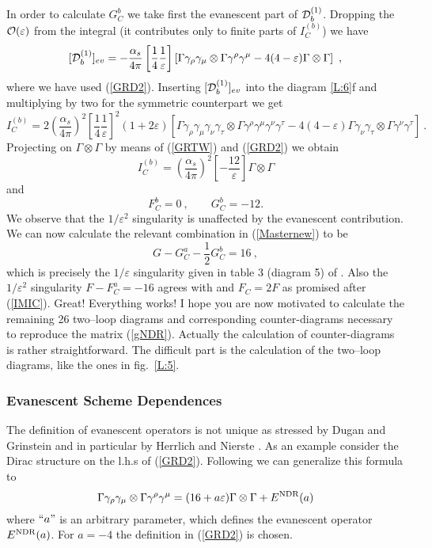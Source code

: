 \documentclass[12pt]{article}
\def\as{\alpha_s}
\newcommand{\be}{\begin{equation}}
\newcommand{\ee}{\end{equation}}
\newcommand{\ord}{{\cal O}}
\begin{document}
\begin{itemize}
\begin{itemize}
In order to calculate $G^b_C$ we take first the evanescent part
of ${\cal D}^{(1)}_b$. Dropping the $\ord(\varepsilon)$ from
the integral (it contributes only to finite parts of $I^{(b)}_C$) we have
\be\label{DS7}
[{\cal D}^{(1)}_b]_{ev}=-\frac{\as}{4\pi}
\left[\frac{1}{4}\frac{1}{\varepsilon}\right]
\left[\Gamma\gamma_\rho\gamma_\mu\otimes\Gamma\gamma^\rho\gamma^\mu
-4 (4-\varepsilon)\Gamma\otimes\Gamma\right]~,
\ee
where we have used (\ref{GRD2}). Inserting $[{\cal D}^{(1)}_b]_{ev}$
into the diagram \ref{L:6}f and multiplying by two for the symmetric
counterpart we get
\be\label{DS8}
I^{(b)}_C=2
\left(\frac{\as}{4\pi}\right)^2
\left[\frac{1}{4}\frac{1}{\varepsilon}\right]^2
(1+2\varepsilon)
\left[
\Gamma\gamma_\rho\gamma_\mu\gamma_\nu\gamma_\tau
\otimes\Gamma\gamma^\rho\gamma^\mu\gamma^\nu\gamma^\tau
-4 (4-\varepsilon)\Gamma\gamma_\nu\gamma_\tau\otimes
\Gamma\gamma^\nu\gamma^\tau\right]~.
\ee
Projecting on $\Gamma\otimes\Gamma$ by means of (\ref{GRTW}) and
(\ref{GRD2}) we obtain
\be\label{DS9}
I^{(b)}_C=\left(\frac{\as}{4\pi}\right)^2
\left[-\frac{12}{\varepsilon}\right]
\Gamma\otimes\Gamma
\ee
and
\be
F^b_C=0~, \quad\quad G^b_C=-12.
\ee
We observe that the $1/\varepsilon^2$ singularity is unaffected by
the evanescent contribution. We can now calculate the relevant
combination in (\ref{Masternew}) to be
\be\label{MaNe}
G-G^a_C-\frac{1}{2}G^b_C=16~,
\ee
which is precisely the $1/\varepsilon$ singularity given in table 3
(diagram 5) of \cite{WEISZ}. Also the $1/\varepsilon^2$ singularity
$F-F^a_C=-16$ agrees with \cite{WEISZ} and $F_C=2F$ as promised
after (\ref{IMIC}). Great! Everything works! I hope you are now
motivated to calculate the remaining 26 two--loop diagrams and
corresponding counter-diagrams necessary to reproduce the
matrix (\ref{gNDR}). Actually the calculation of counter-diagrams
is rather straightforward. The difficult part is the calculation
of the two--loop diagrams, like the ones in fig.~\ref{L:5}. 
\subsubsection{Evanescent Scheme Dependences}
The definition of evanescent operators is not unique as stressed
by Dugan and Grinstein \cite{DuGr} 
and in particular by Herrlich and Nierste \cite{HNE}. As an example
consider the Dirac structure  on the l.h.s of (\ref{GRD2}).
Following \cite{HNE} we can generalize this formula to
\be\label{GEVE}
\Gamma\gamma_\rho\gamma_\mu\otimes\Gamma\gamma^\rho\gamma^\mu 
=(16+a\varepsilon) \Gamma\otimes\Gamma+E^{\rm NDR}(a)
\ee
where $ ``a"$ is an arbitrary parameter, which defines the evanescent
operator $E^{\rm NDR}(a)$. For $a=-4$ the definition in (\ref{GRD2})
is chosen.


\end{itemize}
\end{itemize}
\end{document}
